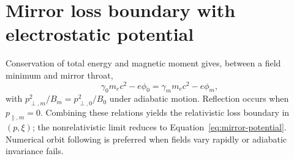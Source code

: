 \section{Mirror loss boundary with electrostatic potential}

Conservation of total energy and magnetic moment gives, between a field minimum and mirror throat,
\begin{equation}
\gamma_0m_ec^2-e\phi_0
=\gamma_mm_ec^2-e\phi_m,
\end{equation}
with $p_{\perp,m}^2/B_m=p_{\perp,0}^2/B_0$ under adiabatic motion. Reflection occurs when $p_{\parallel,m}=0$. Combining these relations yields the relativistic loss boundary in $(p,\xi)$; the nonrelativistic limit reduces to Equation~\eqref{eq:mirror-potential}. Numerical orbit following is preferred when fields vary rapidly or adiabatic invariance fails.
